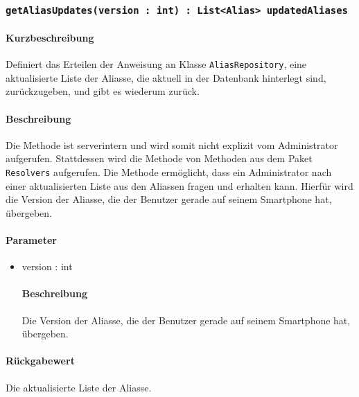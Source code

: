 \subsubsection{\texttt{getAliasUpdates(version : int) : List<Alias> updatedAliases}}%
\paragraph*{Kurzbeschreibung}
Definiert das Erteilen der Anweisung an Klasse \texttt{AliasRepository}, eine aktualisierte Liste der Aliasse, die aktuell in der Datenbank hinterlegt sind, zurückzugeben, und gibt es wiederum zurück.
\paragraph*{Beschreibung}
Die Methode ist serverintern und wird somit nicht explizit vom Administrator aufgerufen.
Stattdessen wird die Methode von Methoden aus dem Paket \texttt{Resolvers} aufgerufen.
Die Methode ermöglicht, dass ein Administrator nach einer aktualisierten Liste aus den Aliassen fragen und erhalten kann.
Hierfür wird die Version der Aliasse, die der Benutzer gerade auf seinem Smartphone hat, übergeben.
\paragraph*{Parameter}
\begin{itemize}
    \item version : int
    		\paragraph*{Beschreibung}
    		Die Version der Aliasse, die der Benutzer gerade auf seinem Smartphone hat, übergeben.
\end{itemize}
\paragraph*{Rückgabewert}
Die aktualisierte Liste der Aliasse.
